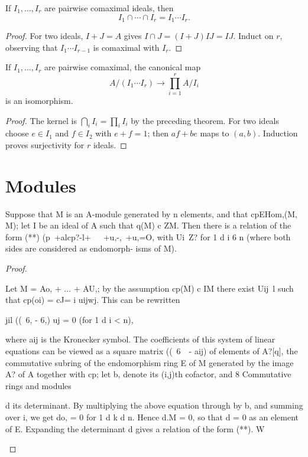 \begin{theorem}
\label{mcrt-auto-theorem-1-3}
\uses{}
If $I_1,\ldots,I_r$ are pairwise comaximal ideals, then
\[
I_1\cap\cdots\cap I_r=I_1\cdots I_r.
\]
\end{theorem}
\begin{proof}
For two ideals, $I+J=A$ gives
$I\cap J=(I+J)IJ=IJ$.  Induct on $r$, observing that $I_1\cdots I_{r-1}$
is comaximal with $I_r$.
\end{proof}

\begin{theorem}
\label{mcrt-auto-theorem-1-4}
If $I_1,\ldots,I_r$ are pairwise comaximal, the canonical map
\[
A/(I_1\cdots I_r)\longrightarrow\prod_{i=1}^r A/I_i
\]
is an isomorphism.
\end{theorem}
\begin{proof}
The kernel is $\bigcap_i I_i=\prod_i I_i$ by the preceding theorem.  For two
ideals choose $e\in I_1$ and $f\in I_2$ with $e+f=1$; then
$af+be$ maps to $(a,b)$.  Induction proves surjectivity for $r$ ideals.
\end{proof}

\section{Modules}
\begin{theorem}[Theorem 2.1]\label{mcrt-auto-theorem-2-1}\uses{}
\begin{mathematicalrecord}
Suppose that M is an A-module generated by n elements,
 and that cpEHom,(M, M); let I be an ideal of A such that q(M) c ZM.
 Then there is a relation of the form
    (**) (p~+alcp?-l+~~~+u,-,~+u,=O,
 with Ui~Z? for 1 d i 6 n (where both sides are considered as endomorph-
 isms of M).
\end{mathematicalrecord}
\end{theorem}
\begin{proof}
\begin{mathematicalrecord}
Let M = Ao, + ... + AU,; by the assumption cp(M) c IM there exist
 Uij~l such that cp(oi) = cJ= i uijwj. This can be rewritten

          jil   ((~6, - 6,) uj = 0 (for 1 d i < n),

where aij is the Kronecker symbol. The coefficients of this system of linear
equations can be viewed as a square matrix ((~6~~- aij) of elements of A?[q],
the commutative subring of the endomorphism ring E of M generated by
the image A? of A together with cp; let b, denote its (i,j)th cofactor, and
8         Commutative   rings and modules

d its determinant. By multiplying the above equation through by b, and
summing over i, we get do, = 0 for 1 d k d n. Hence d.M = 0, so that d = 0
as an element of E. Expanding the determinant d gives a relation of the
form (**). W
\end{mathematicalrecord}
\end{proof}


